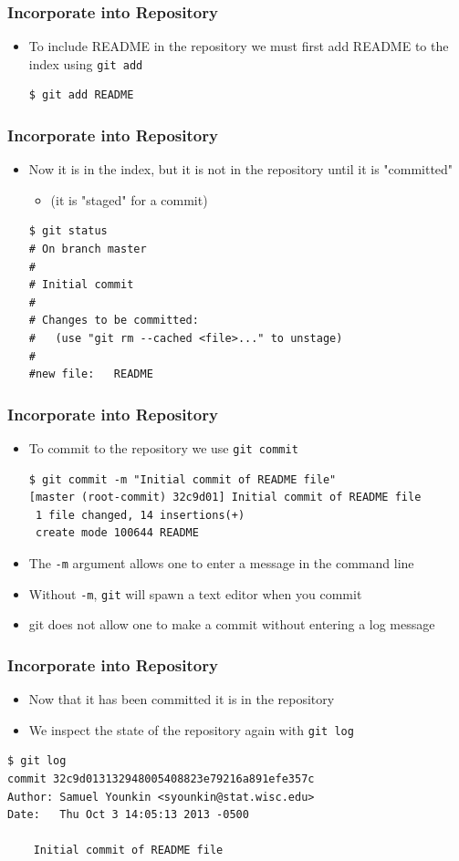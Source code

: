 \documentclass[12pt,t]{beamer}
\newcommand{\bi}{\begin{itemize}}
\newcommand{\bbi}{\vspace{24pt} \begin{itemize} \itemsep8pt}
\newcommand{\ei}{\end{itemize}}
\begin{document}
\begin{frame}[fragile]
\frametitle{Incorporate into Repository}
\bbi
\item To include README in the repository we must first add README to the index using \texttt{git add}
\begin{semiverbatim}
\begin{lstlisting}
$ git add README 
\end{lstlisting}
\end{semiverbatim}
\ei
\end{frame}

\begin{frame}[fragile]
\frametitle{Incorporate into Repository}
\bbi
\item Now it is in the index, but it is not in the repository until it is "committed"
\bi
\item[] (it is "staged" for a commit)
\ei
\begin{semiverbatim}
\begin{lstlisting}
$ git status
# On branch master
#
# Initial commit
#
# Changes to be committed:
#   (use "git rm --cached <file>..." to unstage)
#
#new file:   README
\end{lstlisting}
\end{semiverbatim}
\ei
\end{frame}

\begin{frame}[fragile]
\frametitle{Incorporate into Repository}
\bbi
\item To commit to the repository we use \texttt{git commit}
\begin{semiverbatim}
\begin{lstlisting}
$ git commit -m "Initial commit of README file"
[master (root-commit) 32c9d01] Initial commit of README file
 1 file changed, 14 insertions(+)
 create mode 100644 README
\end{lstlisting}
\end{semiverbatim}
\item The \texttt{-m} argument allows one to enter a message in the command line
\item Without \texttt{-m}, \texttt{git} will spawn a text editor when you commit
\item git does not allow one to make a commit without entering a log message
\ei
\end{frame}

\begin{frame}[fragile]
\frametitle{Incorporate into Repository}
\bbi
\item Now that it has been committed it is in the repository 
\item We inspect the state of the repository again with \texttt{git log}
\ei
\begin{semiverbatim}
\begin{lstlisting}
$ git log
commit 32c9d013132948005408823e79216a891efe357c
Author: Samuel Younkin <syounkin@stat.wisc.edu>
Date:   Thu Oct 3 14:05:13 2013 -0500

    Initial commit of README file

\end{lstlisting}
\end{semiverbatim}
\end{frame}
\end{document}
